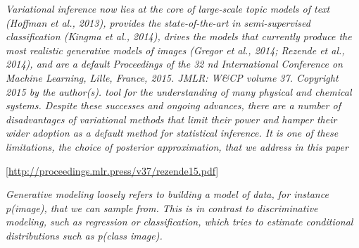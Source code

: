 \documentclass[
  11pt,
]{book}
\begin{document}
\emph{Variational inference now lies at the core of large-scale topic models of text (Hoffman et al., 2013), provides the state-of-the-art in semi-supervised classification (Kingma et al., 2014), drives the models that currently produce the most realistic generative models of images (Gregor et al., 2014; Rezende et al., 2014), and are a default Proceedings of the 32 nd International Conference on Machine Learning, Lille, France, 2015. JMLR: W\&CP volume 37. Copyright 2015 by the author(s). tool for the understanding of many physical and chemical systems. Despite these successes and ongoing advances, there are a number of disadvantages of variational methods that limit their power and hamper their wider adoption as a default method for statistical inference. It is one of these limitations, the choice of posterior approximation, that we address in this paper}

{[}\url{http://proceedings.mlr.press/v37/rezende15.pdf}{]}

\emph{Generative modeling loosely refers to building a model of data, for instance p(image), that we can sample from. This is in contrast to discriminative modeling, such as regression or classification, which tries to estimate conditional distributions such as p(class \textbar{} image).}

\hypertarget{section}{%
\section{}\label{section}}

  
\end{document}
